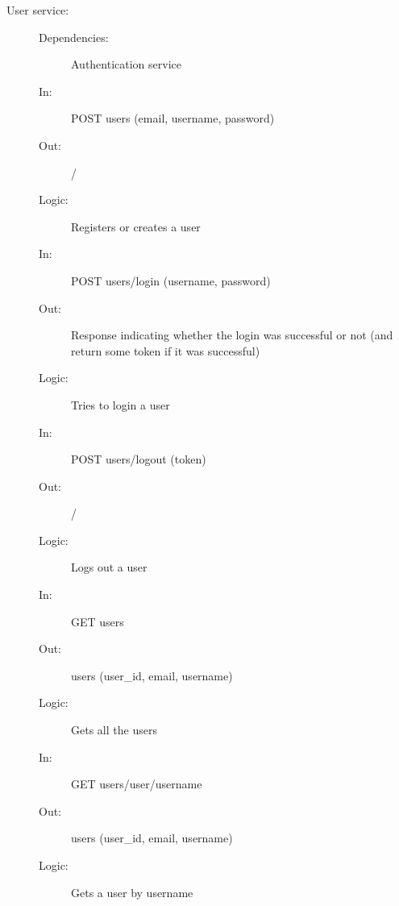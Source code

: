 \documentclass{article}
\begin{document}
\begin{description}
    \item [User service:]
    \begin{description}
        \item[]
        \item[Dependencies:] Authentication service
    \end{description}
    \begin{description}
        \item[]
        \item[In:] POST users (email, username, password)
        \item[Out:] /
        \item[Logic:] Registers or creates a user
        \item[]
    \end{description}
    \begin{description}
        \item[In:] POST users/login (username, password)
        \item[Out:] Response indicating whether the login was successful or not (and return some token if it was successful)
        \item[Logic:] Tries to login a user
        \item[]
    \end{description}
    \begin{description}
        \item[In:] POST users/logout (token)
        \item[Out:] /
        \item[Logic:] Logs out a user
        \item[]
    \end{description}
    \begin{description}
        \item[In:] GET users
        \item[Out:] users (user\_id, email, username)
        \item[Logic:] Gets all the users
        \item[]
    \end{description}
    \begin{description}
        \item[In:] GET users/user/username
        \item[Out:] users (user\_id, email, username)
        \item[Logic:] Gets a user by username
        \item[]

\end{description}
\end{description}
\end{document}
